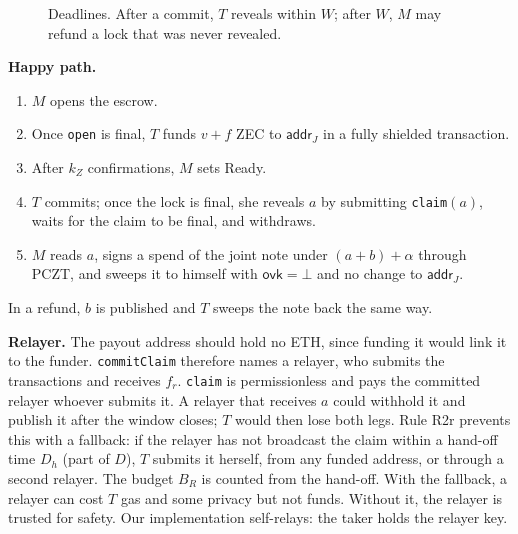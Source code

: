 \documentclass[10pt,letterpaper]{article}
\makeatletter
\renewcommand\subsection{\@startsection{subsection}{2}{\z@}{-0.9em}{0.25em}{\normalfont\normalsize\bfseries}}
\theoremstyle{plain}
\theoremstyle{definition}
\newcommand{\ovk}{\mathsf{ovk}}
\newcommand{\fn}[1]{\texttt{#1}}
\makeatother
\begin{document}
\subsection{Settlement and wallet rules}
\begin{figure}[H]
\centering
{}
\caption{Deadlines. After a commit, $T$ reveals within $W$; after $W$, $M$ may refund a lock that was never revealed.}
\end{figure}

\textbf{Happy path.}
\begin{enumerate}\setlength\itemsep{0.1em}
\item $M$ opens the escrow.
\item Once \fn{open} is final, $T$ funds $v + f$ ZEC to $\mathsf{addr}_J$ in a fully shielded
transaction.
\item After $k_Z$ confirmations, $M$ sets Ready.
\item $T$ commits; once the lock is final, she reveals $a$ by submitting \fn{claim}$(a)$, waits
for the claim to be final, and withdraws.
\item $M$ reads $a$, signs a spend of the joint note under $(a+b)+\alpha$ through PCZT, and sweeps
it to himself with $\ovk = \bot$ and no change to $\mathsf{addr}_J$.
\end{enumerate}
In a refund, $b$ is published and $T$ sweeps the note back the same way.

\textbf{Relayer.} The payout address should hold no ETH, since funding it would link it to the
funder. \fn{commitClaim} therefore names a relayer, who submits the transactions and receives
$f_r$. \fn{claim} is permissionless and pays the committed relayer whoever submits it. A relayer
that receives $a$ could withhold it and publish it after the window closes; $T$ would then lose
both legs. Rule R2r prevents this with a fallback: if the relayer has not broadcast the claim within
a hand-off time $D_h$ (part of $D$), $T$ submits it herself, from any funded address, or through a second relayer. The
budget $B_R$ is counted from the hand-off. With the fallback, a relayer can cost $T$ gas and
some privacy but not funds. Without it, the relayer is trusted for safety. Our implementation
self-relays: the taker holds the relayer key.
\end{document}
